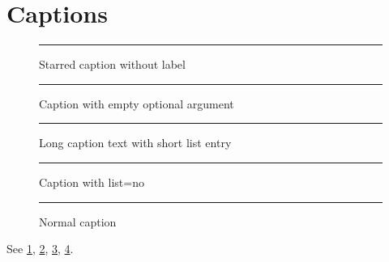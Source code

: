 \documentclass{article}
\begin{document}
\listoffigures
\section{Captions}
\begin{figure}[htbp]
\centering\rule{3cm}{1cm}
\caption*{Starred caption without label}
\end{figure}
\begin{figure}[htbp]
\centering\rule{3cm}{1cm}
\caption[]{Caption with empty optional argument}\label{fig:empty}
\end{figure}
\begin{figure}[htbp]
\centering\rule{3cm}{1cm}
\caption[Short entry]{Long caption text with short list entry}\label{fig:short}
\end{figure}
\begin{figure}[htbp]
\captionsetup{list=no}
\centering\rule{3cm}{1cm}
\caption{Caption with list=no}\label{fig:nolist}
\end{figure}
\begin{figure}[htbp]
\centering\rule{3cm}{1cm}
\caption{Normal caption}\label{fig:normal}
\end{figure}
See \ref{fig:empty}, \ref{fig:short}, \ref{fig:nolist}, \ref{fig:normal}.
\end{document}
